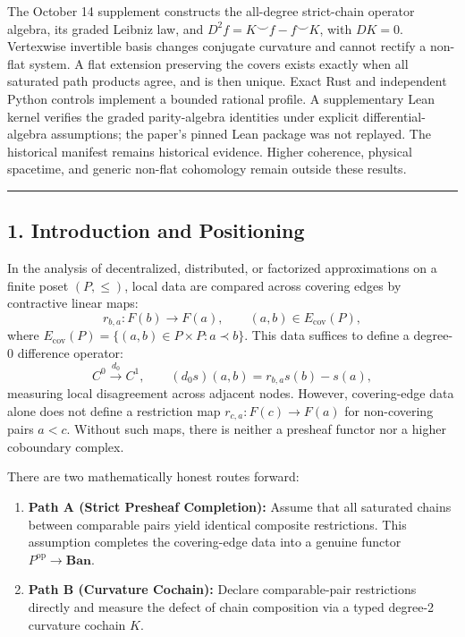 \documentclass[
  english,
  10pt,
  a4paper,
]{article}
\providecommand{\tightlist}{%
  \setlength{\itemsep}{0pt}\setlength{\parskip}{0pt}}
\providecommand{\tightlist}{%
  \setlength{\itemsep}{0pt}\setlength{\parskip}{0pt}}
\begin{document}
The October 14 supplement constructs the all-degree strict-chain
operator algebra, its graded Leibniz law, and
\(D^2f=K\smile f-f\smile K\), with \(DK=0\). Vertexwise invertible basis
changes conjugate curvature and cannot rectify a non-flat system. A flat
extension preserving the covers exists exactly when all saturated path
products agree, and is then unique. Exact Rust and independent Python
controls implement a bounded rational profile. A supplementary Lean
kernel verifies the graded parity-algebra identities under explicit
differential-algebra assumptions; the paper's pinned Lean package was
not replayed. The historical manifest remains historical evidence.
Higher coherence, physical spacetime, and generic non-flat cohomology
remain outside these results.

\begin{center}\rule{0.5\linewidth}{0.5pt}\end{center}

\subsection{1. Introduction and
Positioning}\label{introduction-and-positioning}

In the analysis of decentralized, distributed, or factorized
approximations on a finite poset \((P,\le)\), local data are compared
across covering edges by contractive linear maps: \[
r_{b,a}:F(b)\to F(a),\qquad (a,b)\in E_{\mathrm{cov}}(P),
\] where \(E_{\mathrm{cov}}(P)=\{(a,b)\in P\times P:a\prec b\}\). This
data suffices to define a degree-0 difference operator: \[
C^0 \xrightarrow{\ d_0\ } C^1,\qquad (d_0s)(a,b)=r_{b,a}s(b)-s(a),
\] measuring local disagreement across adjacent nodes. However,
covering-edge data alone does not define a restriction map
\(r_{c,a}:F(c)\to F(a)\) for non-covering pairs \(a<c\). Without such
maps, there is neither a presheaf functor nor a higher coboundary
complex.

There are two mathematically honest routes forward:

\begin{enumerate}
\def\labelenumi{\arabic{enumi}.}
\tightlist
\item
  \textbf{Path A (Strict Presheaf Completion):} Assume that all
  saturated chains between comparable pairs yield identical composite
  restrictions. This assumption completes the covering-edge data into a
  genuine functor \(P^{\mathrm{op}}\to\mathbf{Ban}\).
\item
  \textbf{Path B (Curvature Cochain):} Declare comparable-pair
  restrictions directly and measure the defect of chain composition via
  a typed degree-2 curvature cochain \(K\).
\end{enumerate}
\end{document}
